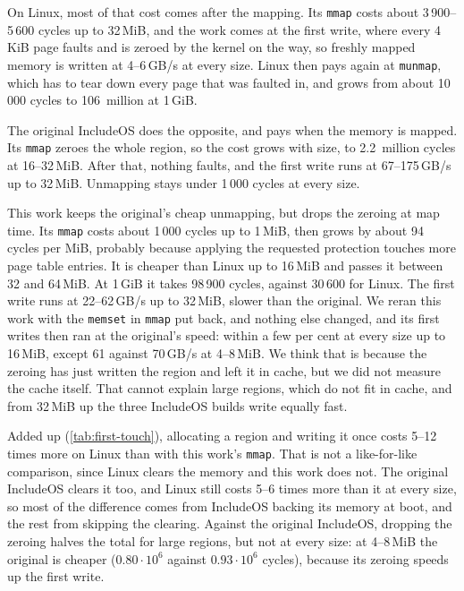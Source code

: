 \documentclass[12pt]{report}
\renewcommand{\_}{\origunderscore\allowbreak}
\begin{document}
On Linux, most of that cost comes after the mapping. Its \texttt{mmap} costs about 3\,900--5\,600 cycles up to 32\,MiB, and the work comes at the first write, where every 4\,KiB page faults and is zeroed by the kernel on the way, so freshly mapped memory is written at 4--6\,GB/s at every size. Linux then pays again at \texttt{munmap}, which has to tear down every page that was faulted in, and grows from about 10\,000 cycles to 106~million at 1\,GiB.

The original IncludeOS does the opposite, and pays when the memory is mapped. Its \texttt{mmap} zeroes the whole region, so the cost grows with size, to 2.2~million cycles at 16--32\,MiB. After that, nothing faults, and the first write runs at 67--175\,GB/s up to 32\,MiB. Unmapping stays under 1\,000 cycles at every size.

This work keeps the original's cheap unmapping, but drops the zeroing at map time. Its \texttt{mmap} costs about 1\,000 cycles up to 1\,MiB, then grows by about 94 cycles per MiB, probably because applying the requested protection touches more page table entries. It is cheaper than Linux up to 16\,MiB and passes it between 32 and 64\,MiB. At 1\,GiB it takes 98\,900 cycles, against 30\,600 for Linux. The first write runs at 22--62\,GB/s up to 32\,MiB, slower than the original. We reran this work with the \texttt{memset} in \texttt{mmap} put back, and nothing else changed, and its first writes then ran at the original's speed: within a few per cent at every size up to 16\,MiB, except 61 against 70\,GB/s at 4--8\,MiB. We think that is because the zeroing has just written the region and left it in cache, but we did not measure the cache itself. That cannot explain large regions, which do not fit in cache, and from 32\,MiB up the three IncludeOS builds write equally fast.

Added up (\cref{tab:first-touch}), allocating a region and writing it once costs 5--12 times more on Linux than with this work's \texttt{mmap}. That is not a like-for-like comparison, since Linux clears the memory and this work does not. The original IncludeOS clears it too, and Linux still costs 5--6 times more than it at every size, so most of the difference comes from IncludeOS backing its memory at boot, and the rest from skipping the clearing. Against the original IncludeOS, dropping the zeroing halves the total for large regions, but not at every size: at 4--8\,MiB the original is cheaper ($0.80\cdot10^{6}$ against $0.93\cdot10^{6}$ cycles), because its zeroing speeds up the first write.
\end{document}
